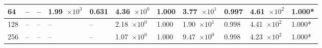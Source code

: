 \begin{table}[!t]
\begin{center}
\begin{small}
\begin{sc}
\begin{tabular}{|l|p{1.2cm}|p{0.8cm}|p{1.2cm}|p{0.8cm}|p{1.2cm}|p{0.8cm}|p{1.2cm}|p{0.8cm}|p{1.2cm}|p{0.8cm}|}
                    \hline
                    64  & --                  & --    & 1.99~$\times10^{3}$ & 0.631 & 4.36~$\times10^{0}$ & 1.000 & 3.77~$\times10^{1}$ & 0.997  & 4.61~$\times10^{2}$ & 1.000* \\
                    \hline
                    128 & --                  & --    & --                  & --    & 2.18~$\times10^{0}$ & 1.000 & 1.90~$\times10^{1}$ & 0.998  & 4.41~$\times10^{2}$ & 1.000* \\
                    \hline
                    256 & --                  & --    & --                  & --    & 1.07~$\times10^{0}$ & 1.000 & 9.47~$\times10^{0}$ & 0.998  & 4.23~$\times10^{2}$ & 1.000* \\
                    \hline
                \end{tabular}
            \end{sc}
        \end{small}
    \end{center}
    \vskip -0.1in
\end{table}

